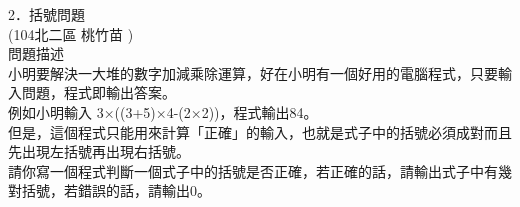 2．括號問題\\
 (104北二區 桃竹苗 )\\
問題描述\\
小明要解決一大堆的數字加減乘除運算，好在小明有一個好用的電腦程式，只要輸入問題，程式即輸出答案。\\
例如小明輸入 3×((3+5)×4-(2×2))，程式輸出84。\\
但是，這個程式只能用來計算「正確」的輸入，也就是式子中的括號必須成對而且先出現左括號再出現右括號。\\
請你寫一個程式判斷一個式子中的括號是否正確，若正確的話，請輸出式子中有幾對括號，若錯誤的話，請輸出0。\\
